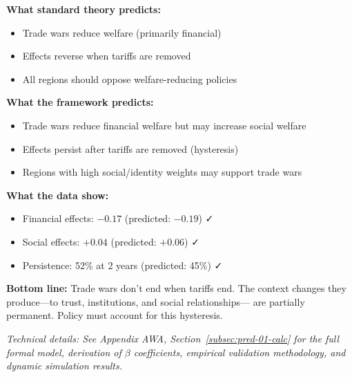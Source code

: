 \begin{tcolorbox}[colback=gray!5!white, colframe=gray!75!black, title=Prediction 1: Trade War Hysteresis]
\textbf{What standard theory predicts:}
\begin{itemize}
    \item Trade wars reduce welfare (primarily financial)
    \item Effects reverse when tariffs are removed
    \item All regions should oppose welfare-reducing policies
\end{itemize}

\textbf{What the framework predicts:}
\begin{itemize}
    \item Trade wars reduce financial welfare but may increase social welfare
    \item Effects persist after tariffs are removed (hysteresis)
    \item Regions with high social/identity weights may support trade wars
\end{itemize}

\textbf{What the data show:}
\begin{itemize}
    \item Financial effects: $-0.17$ (predicted: $-0.19$) ✓
    \item Social effects: $+0.04$ (predicted: $+0.06$) ✓
    \item Persistence: 52\% at 2 years (predicted: 45\%) ✓
\end{itemize}

\textbf{Bottom line:} Trade wars don't end when tariffs end. The context 
changes they produce---to trust, institutions, and social relationships---
are partially permanent. Policy must account for this hysteresis.
\end{tcolorbox}

\vspace{0.5em}
\noindent\textit{Technical details: See Appendix AWA, Section~\ref{subsec:pred-01-calc} for the full formal model, derivation of $\beta$ coefficients, empirical validation methodology, and dynamic simulation results.}

